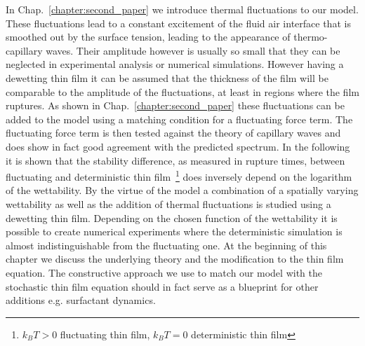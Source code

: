 In Chap.~\ref{chapter:second_paper} we introduce thermal fluctuations to our model.
These fluctuations lead to a constant excitement of the fluid air interface that is smoothed out by the surface tension, leading to the appearance of thermo-capillary waves.
Their amplitude however is usually so small that they can be neglected in experimental analysis or numerical simulations. 
However having a dewetting thin film it can be assumed that the thickness of the film will be comparable to the amplitude of the fluctuations, at least in regions where the film ruptures.
As shown in Chap.~\ref{chapter:second_paper} these fluctuations can be added to the model using a matching condition for a fluctuating force term. 
The fluctuating force term is then tested against the theory of capillary waves and does show in fact good agreement with the predicted spectrum.
In the following it is shown that the stability difference, as measured in rupture times, between fluctuating and deterministic thin film~\footnote{$k_BT > 0$ fluctuating thin film, $k_BT = 0$ deterministic thin film} does inversely depend on the logarithm of the wettability. 
By the virtue of the model a combination of a spatially varying wettability as well as the addition of thermal fluctuations is studied using a dewetting thin film.
Depending on the chosen function of the wettability it is possible to create numerical experiments where the deterministic simulation is almost indistinguishable from the fluctuating one.
At the beginning of this chapter we discuss the underlying theory and the modification to the thin film equation.
The constructive approach we use to match our model with the stochastic thin film equation should in fact serve as a blueprint for other additions e.g. surfactant dynamics. 

